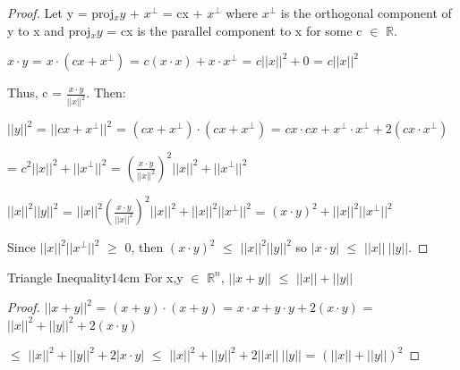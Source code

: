    \begin{proof}
        Let y = proj$_xy$ + $x^{\perp}$ = cx + $x^{\perp}$
        where $x^{\perp}$ is the orthogonal component of y to x and
        proj$_xy$ = cx is the parallel component to x for some c $\in$ $\mathbb{R}$.

        \hspace{0.5cm}
        $x \cdot y$
        = $x \cdot (cx + x^{\perp})$
        = $c(x \cdot x) + x \cdot x^{\perp}$
        = $c||x||^2 + 0$
        = $c||x||^2$

        Thus, c = $\frac{x \cdot y}{||x||^2}$. Then:

        \hspace{0.5cm}
        $||y||^2$
        = $||cx+x^{\perp}||^2$
        = $(cx+x^{\perp}) \cdot (cx+x^{\perp})$
        = $cx \cdot cx + x^{\perp} \cdot x^{\perp} + 2(cx \cdot x^{\perp})$

        \hspace{1.5cm}
        = $c^2||x||^2 + ||x^{\perp}||^2$
        = $(\frac{x \cdot y}{||x||^2})^2 ||x||^2 + ||x^{\perp}||^2$

        \hspace{0.5cm}
        $||x||^2 ||y||^2$
        = $||x||^2(\frac{x \cdot y}{||x||^2})^2 ||x||^2 + ||x||^2 ||x^{\perp}||^2$
        = $(x \cdot y)^2 + ||x||^2 ||x^{\perp}||^2$

        Since $||x||^2 ||x^{\perp}||^2$ $\geq$ 0, then
        $(x \cdot y)^2$ $\leq$ $||x||^2 ||y||^2$
        so $|x \cdot y|$ $\leq$ $||x|| \ ||y||$.
    \end{proof}

    \vspace{0.5cm}



    \begin{wtheorem}{Triangle Inequality}{14cm}
        For x,y $\in$ $\mathbb{R}^n$,
        $||x+y||$ $\leq$ $||x|| + ||y||$
    \end{wtheorem}

    \begin{proof}
        $||x+y||^2$
        = $(x+y) \cdot (x+y)$
        = $x \cdot x + y \cdot y + 2(x \cdot y)$
        = $||x||^2 + ||y||^2 +2(x \cdot y)$

        \hspace{1.55cm}
        $\leq$ $||x||^2 + ||y||^2 +2|x \cdot y|$
        $\leq$ $||x||^2 + ||y||^2 +2||x|| \ ||y||$
        = $(||x|| + ||y||)^2$
    \end{proof}

